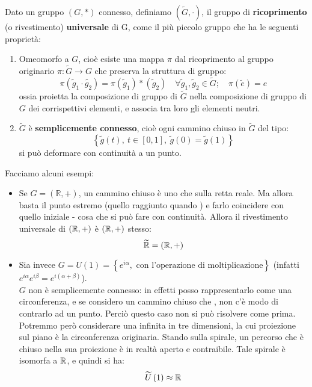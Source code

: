 \documentclass[../../FisicaTeorica.tex]{subfiles}
\begin{document}
\begin{dfn}
Dato un gruppo $(G,*)$ connesso, definiamo $(\widetilde{G},\cdot)$, il gruppo di \textbf{ricoprimento} (o rivestimento) \textbf{universale} di G, come il più piccolo gruppo che ha le seguenti proprietà:
\begin{enumerate}
    \item Omeomorfo a $G$, cioè esiste una mappa $\pi$ dal ricoprimento al gruppo originario $\pi :\widetilde{G}\to G$ che preserva la struttura di gruppo:
\[
    \pi(\tilde{g}_1 \cdot \tilde{g_2}) = \pi(\tilde{g}_1) * (\tilde{g}_2)\quad \forall \tilde{g}_1, \tilde{g}_2 \in \tilde{G}; \quad \pi(\tilde{e})=e
\]
ossia proietta la composizione di gruppo di $\tilde{G}$ nella composizione di gruppo di $G$ dei corrispettivi elementi, e associa tra loro gli elementi neutri.
        \item $\widetilde{G}$ è \textbf{semplicemente connesso}, cioè ogni cammino chiuso in $\widetilde{G}$ del tipo:
\[
\left\{\widetilde{g}\left(t\right),\ t\in\left[0,1\right],\ \widetilde{g}\left(0\right)=\widetilde{g}(1)\right\}
\]
si può deformare con continuità a un punto.
\end{enumerate}
\end{dfn}
Facciamo alcuni esempi: %
\begin{itemize}
\item Se $G=\left(\mathbb{R},+\right)$, un cammino chiuso è uno che  sulla retta reale. Ma allora basta  il punto estremo (quello raggiunto quando ) e farlo coincidere con quello iniziale - cosa che si può fare con continuità. Allora il rivestimento universale di $(\mathbb{R},+)$ è $(\mathbb{R},+)$ stesso:
\[
\widetilde{\mathbb{R}}=(\mathbb{R},+)
\]
\item Sia invece $G=U\left(1\right)= \left\{e^{i\alpha},\text{ con l'operazione di moltiplicazione}\right\}$ (infatti $e^{i\alpha}e^{i\beta}=e^{i\left(\alpha+\beta\right)}$).\\
$G$ non è semplicemente connesso: in effetti posso rappresentarlo come una circonferenza, e se considero un cammino chiuso che , non c'è modo di contrarlo ad un punto. Perciò questo caso non si può risolvere come prima.\\
Potremmo però considerare una  infinita in tre dimensioni, la cui proiezione sul piano è la circonferenza originaria. Stando sulla spirale, un percorso che è chiuso nella sua proiezione è in realtà aperto e contraibile. Tale spirale è isomorfa a $\mathbb{R}$, e quindi si ha:
\[\widetilde{U}\left(1\right)\approx \mathbb{R}
\]
\end{itemize}
\end{document}
